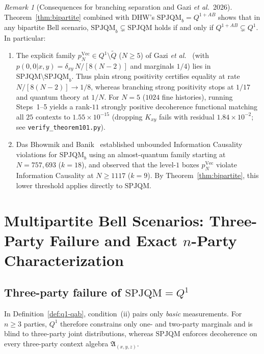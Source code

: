 \documentclass[11pt,a4paper]{article}
\theoremstyle{definition}
\theoremstyle{remark}
\newtheorem{remark}[theorem]{Remark}
\newcommand{\EA}{\mathfrak{A}}
\newcommand{\SPJQM}{\mathrm{SPJQM}}
\newcommand{\SPJQMb}{\mathrm{SPJQM}_b}
\newcommand{\Qone}{Q^{1}}
\newcommand{\QAB}{Q^{1+AB}}
\newcommand{\tQ}{\widetilde{Q}}
\begin{document}
\begin{remark}[Consequences for branching separation and Gazi \emph{et al.}~2026]
\label{rem:gazi}
Theorem~\ref{thm:bipartite} combined with DHW's $\SPJQMb = \QAB$ shows that in any bipartite Bell scenario, $\SPJQMb \subsetneq \SPJQM$ holds if and only if $\QAB \subsetneq \Qone$. In particular:
\begin{enumerate}[label=(\alph*),nosep]
\item The explicit family $p^{\mathrm{Vec}}_N \in \Qone \setminus \tQ$ ($N \ge 5$) of Gazi \emph{et al.}~\cite{Gazi2026} (with $p(0,0|x,y) = \delta_{xy}\,N/[8(N-2)]$ and marginals $1/4$) lies in $\SPJQM \setminus \SPJQMb$. Thus plain strong positivity certifies equality at rate $N/[8(N-2)] \to 1/8$, whereas branching strong positivity stops at $1/17$ and quantum theory at $1/N$. For $N=5$ ($1024$ fine histories), running Steps~1--5 yields a rank-$11$ strongly positive decoherence functional matching all $25$ contexts to $1.55 \times 10^{-15}$ (dropping $K_{xy}$ fails with residual $1.84 \times 10^{-2}$; see \texttt{verify\_theorem101.py}).
\item Das Bhowmik and Banik~\cite{DasBhowmikBanik2026} established unbounded Information Causality violations for $\SPJQMb$ using an almost-quantum family starting at $N = 757{,}693$ ($k=18$), and observed that the level-$1$ boxes $p^{\mathrm{Vec}}_N$ violate Information Causality at $N \ge 1117$ ($k=9$). By Theorem~\ref{thm:bipartite}, this lower threshold applies directly to $\SPJQM$.
\end{enumerate}
\end{remark}

\section{Multipartite Bell Scenarios: Three-Party Failure and Exact $n$-Party Characterization}
\label{sec:multipartite}

\subsection{Three-party failure of $\SPJQM = \Qone$}

In Definition~\ref{def:q1-qab}, condition~(ii) pairs only \emph{basic} measurements. For $n \ge 3$ parties, $\Qone$ therefore constrains only one- and two-party marginals and is blind to three-party joint distributions, whereas $\SPJQM$ enforces decoherence on every three-party context algebra $\EA_{(x,y,z)}$.
\end{document}

